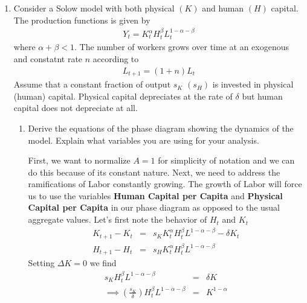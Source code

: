 \documentclass[11pt]{SelfArxOneColBMN}
\affiliation{\textsuperscript{1}\textit{John E. Walker Department of Economics,
Clemson University,Clemson, SC: email ijdavis@g.clemson.edu}}
\date{\small{Version ~\today}}
\begin{document}
\flushbottom

\maketitle

\renewcommand{\theexercise}{\arabic{exercise}}%

\begin{enumerate}
  \item Consider a Solow model with both physical $(K)$ and human $(H)$ capital. The production functions is given by
  \begin{eqnarray*}
    Y_t = K_t^\alpha H_t^\beta L_t^{1 - \alpha - \beta}
  \end{eqnarray*}
  where $\alpha + \beta < 1$. The number of workers grows over time at an exogenous and constatnt rate $n$ according to
  \begin{eqnarray*}
    L_{t+1} = (1 + n)L_t
  \end{eqnarray*}
  Assume that a constant fraction of output $s_K$ $(s_H)$ is invested in physical (human) capital. Physical capital depreciates at the rate of $\delta$ but human capital does not depreciate at all.
  \begin{enumerate}
    \item Derive the equations of the phase diagram showing the dynamics of the model. Explain what variables you are using for your analysis.
    \begin{solution}
      First, we want to normalize $A = 1$ for simplicity of notation and we can do this because of its constant nature. Next, we need to address the ramifications of Labor constantly growing. The growth of Labor will force us to use the variables \textbf{Human Capital per Capita} and \textbf{Physical Capital per Capita} in our phase diagram as opposed to the usual aggregate values. Let's first note the behavior of $H_t$ and $K_t$
      \begin{eqnarray*}
        K_{t+1} - K_t &=& s_KK_t^\alpha H_t^\beta L^{1 - \alpha - \beta} - \delta K_t\\
        H_{t+1} - H_t &=& s_HK_t^\alpha H_t^\beta L^{1 - \alpha - \beta}
      \end{eqnarray*}
      Setting $\Delta K = 0$ we find
      \begin{eqnarray*}
        s_KH_t^\beta L^{1 - \alpha - \beta} &=& \delta K\\
        \implies (\frac{s_K}{\delta})H_t^\beta L^{1 - \alpha - \beta} &=& K^{1 - \alpha}\\

\end{eqnarray*}
\end{solution}
\end{enumerate}
\end{enumerate}
\end{document}
